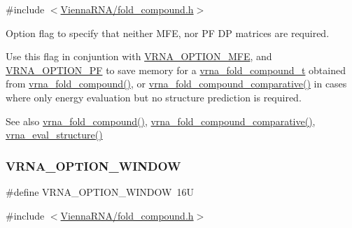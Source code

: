 {\ttfamily \#include $<$\mbox{\hyperlink{fold__compound_8h}{Vienna\+R\+N\+A/fold\+\_\+compound.\+h}}$>$}



Option flag to specify that neither M\+FE, nor PF DP matrices are required. 

Use this flag in conjuntion with \mbox{\hyperlink{group__fold__compound_gae63be9127fe7dcc1f9bb14f5bb1064ee}{V\+R\+N\+A\+\_\+\+O\+P\+T\+I\+O\+N\+\_\+\+M\+FE}}, and \mbox{\hyperlink{group__fold__compound_gabfbadcddda3e74ce7f49035ef8f058f7}{V\+R\+N\+A\+\_\+\+O\+P\+T\+I\+O\+N\+\_\+\+PF}} to save memory for a \mbox{\hyperlink{group__fold__compound_ga1b0cef17fd40466cef5968eaeeff6166}{vrna\+\_\+fold\+\_\+compound\+\_\+t}} obtained from \mbox{\hyperlink{group__fold__compound_ga6601d994ba32b11511b36f68b08403be}{vrna\+\_\+fold\+\_\+compound()}}, or \mbox{\hyperlink{group__fold__compound_gad6bacc816af274922b13d947f708aa0c}{vrna\+\_\+fold\+\_\+compound\+\_\+comparative()}} in cases where only energy evaluation but no structure prediction is required.

\begin{DoxySeeAlso}{See also}
\mbox{\hyperlink{group__fold__compound_ga6601d994ba32b11511b36f68b08403be}{vrna\+\_\+fold\+\_\+compound()}}, \mbox{\hyperlink{group__fold__compound_gad6bacc816af274922b13d947f708aa0c}{vrna\+\_\+fold\+\_\+compound\+\_\+comparative()}}, \mbox{\hyperlink{group__eval_ga58f199f1438d794a265f3b27fc8ea631}{vrna\+\_\+eval\+\_\+structure()}} 
\end{DoxySeeAlso}
\mbox{\label{group__fold__compound_ga2b2a8009ccdccc3eb1571556261aee8e}} 
\subsubsection{\texorpdfstring{V\+R\+N\+A\+\_\+\+O\+P\+T\+I\+O\+N\+\_\+\+W\+I\+N\+D\+OW}{VRNA\_OPTION\_WINDOW}}
{\footnotesize\ttfamily \#define V\+R\+N\+A\+\_\+\+O\+P\+T\+I\+O\+N\+\_\+\+W\+I\+N\+D\+OW~16U}



{\ttfamily \#include $<$\mbox{\hyperlink{fold__compound_8h}{Vienna\+R\+N\+A/fold\+\_\+compound.\+h}}$>$}



